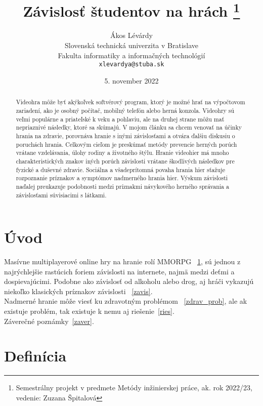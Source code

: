 \documentclass[10pt,twoside,english,a4paper]{article}
\title{Závislosť študentov na hrách
\thanks{Semestrálny projekt v predmete Metódy inžinierskej práce, ak. rok 2022/23, vedenie: Zuzana Špitalová}}
\author{Ákos Lévárdy\\[2pt]
	{\small Slovenská technická univerzita v Bratislave}\\
	{\small Fakulta informatiky a informačných technológií}\\
	{\small \texttt{xlevardya@stuba.sk}}	
	}
\date{\small 5. november 2022}
\begin{document}
\maketitle

\begin{abstract}

Videohra môže byť akýkoľvek softvérový program, ktorý je možné hrať na výpočtovom zariadení, ako je osobný počítač, mobilný telefón alebo herná konzola. Videohry sú veľmi populárne a priateľské k veku a pohlaviu, ale na druhej strane môžu mať nepriaznivé následky, ktoré sa skúmajú. V mojom článku sa chcem venovať na účinky hrania na zdravie, porovnáva hranie s inými závislosťami a otvára ďalšiu diskusiu o poruchách hrania. Celkovým cieľom je preskúmať metódy prevencie herných porúch vrátane vzdelávania, úlohy rodiny a životného štýlu. Hranie videohier má mnoho charakteristických znakov iných porúch závislosti vrátane škodlivých následkov pre fyzické a duševné zdravie. Sociálna a všadeprítomná povaha hrania hier sťažuje rozpoznanie príznakov a symptómov nadmerného hrania hier. Výskum závislosti naďalej preukazuje podobnosti medzi príznakmi návykového herného správania a závislosťami súvisiacimi s látkami.

\end{abstract}

\pagebreak

\section*{Úvod}

Masívne multiplayerové online hry na hranie rolí MMORPG ~\ref{def}, sú jednou z najrýchlejšie rastúcich foriem závislosti na internete, najmä medzi deťmi a dospievajúcimi. Podobne ako závislosť od alkoholu alebo drog, aj hráči vykazujú niekoľko klasických príznakov závislosti ~\ref{zavis}.\\
Nadmerné hranie môže viesť ku zdravotným problémom ~\ref{zdrav_prob}, ale ak existuje problém, tak existuje k nemu aj riešenie~\ref{ries}.\\
Záverečné poznámky~\ref{zaver}.

\section{Definícia} \label{def}
 
\end{document}
